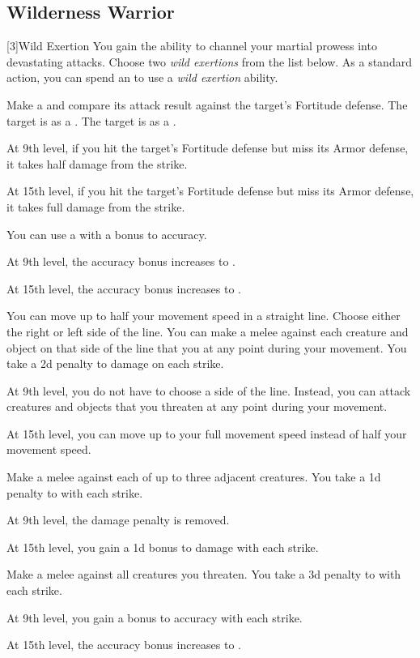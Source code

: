     \subsection{Wilderness Warrior}
        [3]{Wild Exertion} 
        You gain the ability to channel your martial prowess into devastating attacks.
        Choose two \textit{wild exertions} from the list below.
        As a standard action, you can spend an  to use a \textit{wild exertion} ability.
        {
             Make a  and compare its attack result against the target's Fortitude defense.
             The target is \sickened as a .
             The target is \nauseated as a .

            At 9th level, if you hit the target's Fortitude defense but miss its Armor defense, it takes half damage from the strike.
            \par At 15th level, if you hit the target's Fortitude defense but miss its Armor defense, it takes full damage from the strike.

             You can use a  with a  bonus to accuracy.

            At 9th level, the accuracy bonus increases to .
            \par At 15th level, the accuracy bonus increases to .

             You can move up to half your movement speed in a straight line.
            Choose either the right or left side of the line.
            You can make a melee  against each creature and object on that side of the line that you  at any point during your movement.
            You take a \minus2d penalty to damage on each strike.

            At 9th level, you do not have to choose a side of the line.
            Instead, you can attack creatures and objects that you threaten at any point during your movement.
            \par At 15th level, you can move up to your full movement speed instead of half your movement speed.

             Make a melee  against each of up to three adjacent creatures.
            You take a \minus1d penalty to  with each strike.

            At 9th level, the damage penalty is removed.
            \par At 15th level, you gain a \plus1d bonus to damage with each strike.

             Make a melee  against all creatures you threaten.
            You take a \minus3d penalty to  with each strike.

            At 9th level, you gain a  bonus to accuracy with each strike.
            \par At 15th level, the accuracy bonus increases to .
        }

